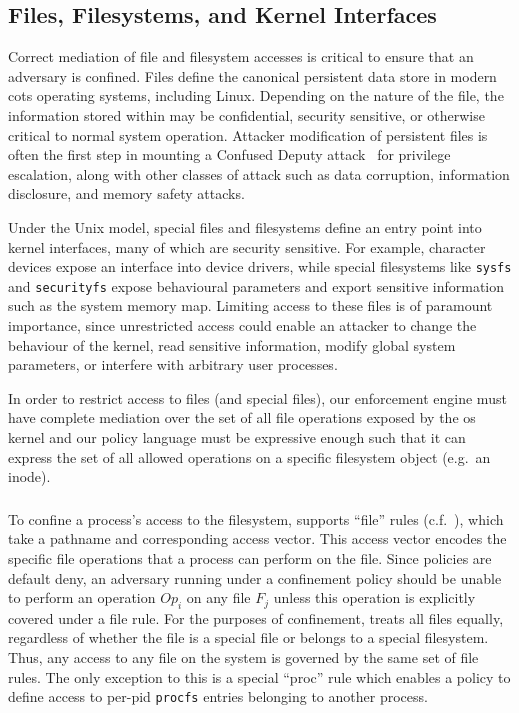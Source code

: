 \subsection{Files, Filesystems, and Kernel Interfaces}

Correct mediation of file and filesystem accesses is critical to ensure that an adversary
is confined. Files define the canonical persistent data store in modern \gls{cots}
operating systems, including Linux. Depending on the nature of the file, the information
stored within may be confidential, security sensitive, or otherwise critical to normal
system operation. Attacker modification of persistent files is often the first step in
mounting a Confused Deputy attack~\cite{hardy1988_confused_deputy} for privilege
escalation, along with other classes of attack such as data corruption, information
disclosure, and memory safety attacks.

Under the Unix model, special files and filesystems define an entry point into kernel
interfaces, many of which are security sensitive. For example, character devices expose an
interface into device drivers, while special filesystems like \texttt{sysfs} and
\texttt{securityfs} expose behavioural parameters and export sensitive information such as
the system memory map. Limiting access to these files is of paramount importance, since
unrestricted access could enable an attacker to change the behaviour of the kernel, read
sensitive information, modify global system parameters, or interfere with arbitrary user
processes.

In order to restrict access to files (and special files), our enforcement engine must have
complete mediation over the set of all file operations exposed by the \gls{os} kernel and
our policy language must be expressive enough such that it can express the set of all
allowed operations on a specific filesystem object (e.g.\ an inode).

\subsubsection{\bpfbox{}}

To confine a process's access to the filesystem, \bpfbox{} supports \enquote{file} rules
(c.f.\ ), which take a pathname and corresponding access
vector. This access vector encodes the specific file operations that a process can perform
on the file. Since \bpfbox{} policies are default deny, an adversary running under
a \bpfbox{} confinement policy should be unable to perform an operation $Op_i$ on any file
$F_j$ unless this operation is explicitly covered under a file rule. For the purposes of
confinement, \bpfbox{} treats all files equally, regardless of whether the file is
a special file or belongs to a special filesystem. Thus, any access to any file on the
system is governed by the same set of file rules. The only exception to this is a special
\enquote{proc} rule which enables a policy to define access to per-pid \texttt{procfs}
entries belonging to another process.

